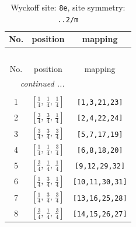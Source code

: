 \documentclass[fleqn,8pt]{jsarticle}
\begin{document}
\renewcommand{\arraystretch}{1.2}
\begin{longtable}{ccc}
\caption{Wyckoff site: {\tt 8e}, site symmetry: {\tt ..2/m}}
 \\
 \hline \hline
No. & position & mapping \\ \hline \endfirsthead

\multicolumn{2}{l}{\tablename\ \thetable{}} \\
 \hline \hline
No. & position & mapping \\ \hline \endhead

 \hline \hline
\multicolumn{2}{r}{\footnotesize\it continued ...} \\ \endfoot

 \hline \hline
\multicolumn{2}{r}{} \\ \endlastfoot

1 & $\left[ \frac{1}{4},\, \frac{1}{4},\, \frac{1}{4} \right]$ & {\tt [1,3,21,23]} \\ \hline
2 & $\left[ \frac{3}{4},\, \frac{3}{4},\, \frac{1}{4} \right]$ & {\tt [2,4,22,24]} \\ \hline
3 & $\left[ \frac{3}{4},\, \frac{3}{4},\, \frac{3}{4} \right]$ & {\tt [5,7,17,19]} \\ \hline
4 & $\left[ \frac{1}{4},\, \frac{1}{4},\, \frac{3}{4} \right]$ & {\tt [6,8,18,20]} \\ \hline
5 & $\left[ \frac{3}{4},\, \frac{1}{4},\, \frac{1}{4} \right]$ & {\tt [9,12,29,32]} \\ \hline
6 & $\left[ \frac{1}{4},\, \frac{3}{4},\, \frac{1}{4} \right]$ & {\tt [10,11,30,31]} \\ \hline
7 & $\left[ \frac{1}{4},\, \frac{3}{4},\, \frac{3}{4} \right]$ & {\tt [13,16,25,28]} \\ \hline
8 & $\left[ \frac{3}{4},\, \frac{1}{4},\, \frac{3}{4} \right]$ & {\tt [14,15,26,27]} \\
\end{longtable}
\renewcommand{\arraystretch}{1.2}
\end{document}
